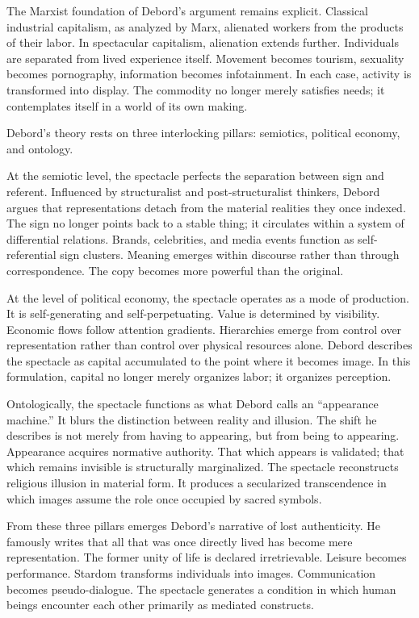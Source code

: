 \documentclass[11pt]{article}
\begin{document}
The Marxist foundation of Debord’s argument remains explicit. Classical industrial capitalism, as analyzed by Marx, alienated workers from the products of their labor. In spectacular capitalism, alienation extends further. Individuals are separated from lived experience itself. Movement becomes tourism, sexuality becomes pornography, information becomes infotainment. In each case, activity is transformed into display. The commodity no longer merely satisfies needs; it contemplates itself in a world of its own making.

Debord’s theory rests on three interlocking pillars: semiotics, political economy, and ontology.

At the semiotic level, the spectacle perfects the separation between sign and referent. Influenced by structuralist and post-structuralist thinkers, Debord argues that representations detach from the material realities they once indexed. The sign no longer points back to a stable thing; it circulates within a system of differential relations. Brands, celebrities, and media events function as self-referential sign clusters. Meaning emerges within discourse rather than through correspondence. The copy becomes more powerful than the original.

At the level of political economy, the spectacle operates as a mode of production. It is self-generating and self-perpetuating. Value is determined by visibility. Economic flows follow attention gradients. Hierarchies emerge from control over representation rather than control over physical resources alone. Debord describes the spectacle as capital accumulated to the point where it becomes image. In this formulation, capital no longer merely organizes labor; it organizes perception.

Ontologically, the spectacle functions as what Debord calls an ``appearance machine.'' It blurs the distinction between reality and illusion. The shift he describes is not merely from having to appearing, but from being to appearing. Appearance acquires normative authority. That which appears is validated; that which remains invisible is structurally marginalized. The spectacle reconstructs religious illusion in material form. It produces a secularized transcendence in which images assume the role once occupied by sacred symbols.

From these three pillars emerges Debord’s narrative of lost authenticity. He famously writes that all that was once directly lived has become mere representation. The former unity of life is declared irretrievable. Leisure becomes performance. Stardom transforms individuals into images. Communication becomes pseudo-dialogue. The spectacle generates a condition in which human beings encounter each other primarily as mediated constructs.
\end{document}
